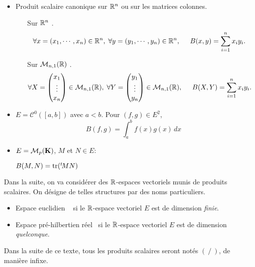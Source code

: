 \begin{exples}
\begin{itemize}
\item Produit scalaire canonique sur $\mathbb{R}^n$ ou sur les matrices colonnes.
\begin{itemize}
  \item[Sur $\mathbb{R}^n$].
\[
  \forall x = (x_1, \cdots, x_n) \in \mathbb{R}^n,\;  \forall y = (y_1, \cdots, y_n) \in \mathbb{R}^n, \hspace{0.5cm}
  B(x,y) = \sum_{i=1}^{n}x_iy_i.
\]
  \item[Sur $\mathcal{M}_{n,1}(\mathbb{R})$].
\[
  \forall X = 
  \begin{pmatrix}
    x_1\\ \vdots \\ x_n
  \end{pmatrix}
 \in \mathcal{M}_{n,1}(\mathbb{R}),\;
   \forall Y = 
  \begin{pmatrix}
    y_1\\ \vdots \\ y_n
  \end{pmatrix}
 \in \mathcal{M}_{n,1}(\mathbb{R}),\hspace{0.5cm}
 B(X,Y) = \sum_{i=1}^{n}x_iy_i.
\]
\end{itemize}

\item $E = \mathcal{C}^{0}( [a,b] )$ avec $a < b$. Pour $(f,g) \in E^2$,
\begin{displaymath}
 B(f,g) = \int_{a}^{b} f(x) g(x) \,dx
\end{displaymath}
\item $E = \mathcal{M}_{p}(\mathbf{K})$, $M$ et $N \in E$:
\begin{center}
$B(M,N) = \mathrm{tr}( \mathstrut^t\! M N )$
\end{center}
\end{itemize}
\end{exples}

Dans la suite, on va considérer des $\mathbb{R}$-espaces vectoriels munis de produits scalaires. On désigne de telles structures par des noms particuliers.
\begin{itemize}
\item \og Espace euclidien \fg~ si le $\mathbb{R}$-espace vectoriel $E$ est de dimension \emph{finie}.
\item \og Espace pré-hilbertien réel\fg~  si le $\mathbb{R}$-espace vectoriel $E$ est de dimension \emph{quelconque}.
\end{itemize}
\begin{nota}
Dans la suite de ce texte, tous les produits scalaires seront notés $(~/~)$, de manière infixe.
\end{nota}


